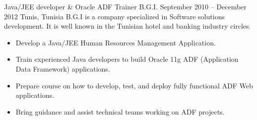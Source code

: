 \documentclass[10pt,a4paper]{resume-settings}
\begin{document}
\cvevent
    {Java/JEE developer \& Oracle ADF Trainer}
    {B.G.I.}
    {September 2010 -- December 2012}
    {Tunis, Tunisia}
    {B.G.I is a company specialized in Software solutions development. It is well known in the Tunisian hotel and banking industry circles.}
    \begin{itemize}
        \item Develop a Java/JEE Human Resources Management Application.
        \item Train experienced Java developers to build Oracle 11g ADF (Application Data Framework) applications.
        \item Prepare course on how to develop, test, and deploy fully functional ADF Web applications.
        \item Bring guidance and assist technical teams working on ADF projects.
    \end{itemize}
    
\end{document}
